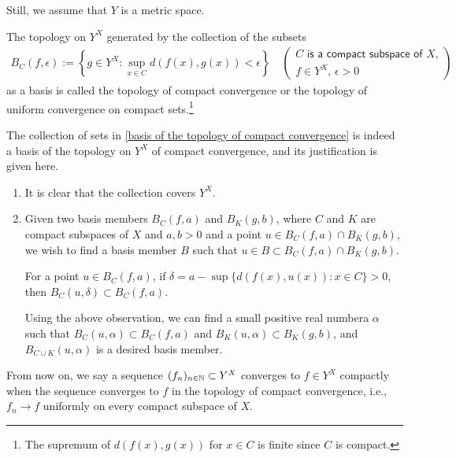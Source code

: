 Still, we assume that $Y$ is a metric space.
\begin{defi}
    The topology on $Y^X$ generated by the collection of the subsets
    \begin{align}\label{basis of the topology of compact convergence}
        B_C(f, \epsilon):=\left\{g\in Y^X: \sup_{x\in C} d(f(x), g(x))<\epsilon\right\}\quad
        \begin{pmatrix}
            \textsf{$C$ is a compact subspace of $X$,}\\
            f\in Y^X,\, \epsilon>0
        \end{pmatrix}
    \end{align}
    as a basis is called the topology of compact convergence or the topology of uniform convergence on compact sets.\footnote{The supremum of $d(f(x), g(x))$ for $x\in C$ is finite since $C$ is compact.}
\end{defi}
\begin{rmk}
    The collection of sets in \cref{basis of the topology of compact convergence} is indeed a basis of the topology on $Y^X$ of compact convergence, and its justification is given here.
    \begin{enumerate}
        \item[(1)]
        {
            It is clear that the collection covers $Y^X$.
        }
        \item[(2)]
        {
            Given two basis members $B_C(f, a)$ and $B_K(g, b)$, where $C$ and $K$ are compact subspaces of $X$ and $a, b>0$ and a point $u\in B_C(f, a)\cap B_K(g, b)$, we wish to find a basis member $B$ such that $u\in B\subset B_C(f, a)\cap B_K(g, b)$.
            \begin{center}
                For a point $u\in B_C(f, a)$, if $\delta=a-\sup\{d(f(x), u(x)): x\in C\}>0$, then $B_C(u, \delta)\subset B_C(f, a)$.
            \end{center}
            Using the above observation, we can find a small positive real numbera $\alpha$ such that $B_C(u, \alpha)\subset B_C(f, a)$ and $B_K(u, \alpha)\subset B_K(g, b)$, and $B_{C\cup K}(u, \alpha)$ is a desired basis member.
        }
    \end{enumerate}
\end{rmk}
From now on, we say a sequence $(f_n)_{n\in{\mathbb{N}}}\subset Y^X$ converges to $f\in Y^X$ compactly when the sequence converges to $f$ in the topology of compact convergence, i.e., $f_n\rightarrow f$ uniformly on every compact subspace of $X$.

